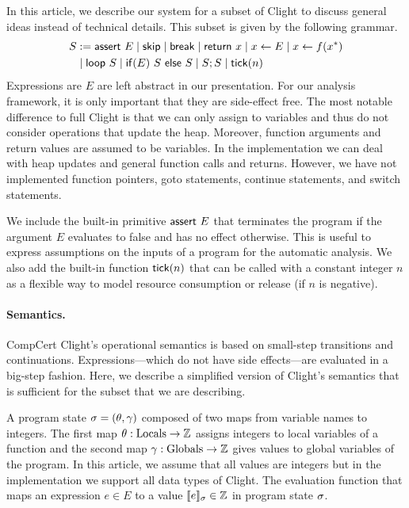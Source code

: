 \documentclass[nocopyrightspace,preprint]{sigplanconf}
\begin{document}
In this article, we describe our system for a subset of Clight to
discuss general ideas instead of technical details.  This subset is
given by the following grammar.
%
\begin{align*}
S &:= \mathsf{assert}~E
\mid \mathsf{skip}
\mid \mathsf{break}
\mid \mathsf{return}~x
\mid x \gets E
\mid x \gets f(x^*)
\\
& \mid \mathsf{loop}~S
\mid \mathsf{if}(E)~S~\mathsf{else}~S
\mid S;S
\mid \mathsf{tick}(n)
\end{align*}
%
Expressions are $E$ are left abstract in our presentation.  For our
analysis framework, it is only important that they are side-effect
free.
%
The most notable difference to full Clight is that we can only assign
to variables and thus do not consider operations that update the heap.
Moreover, function arguments and return values are assumed to be
variables.  In the implementation we can deal with heap updates and
general function calls and returns.  However, we have not implemented
function pointers, goto statements, continue statements, and switch
statements.

We include the built-in primitive $\mathsf{assert}~E$ that terminates
the program if the argument $E$ evaluates to false and has no effect
otherwise.  This is useful to express assumptions on the inputs of a
program for the automatic analysis.  We also add the built-in function
$\mathsf{tick}(n)$ that can be called with a constant integer $n$ as a
flexible way to model resource consumption or release (if $n$ is
negative).


\paragraph{Semantics.}

CompCert Clight's operational semantics is based on small-step
transitions and continuations.  Expressions---which do not have side
effects---are evaluated in a big-step fashion.  Here, we describe a
simplified version of Clight's semantics that is sufficient for the
subset that we are describing.

A program state $\sigma = (\theta, \gamma)$ composed of two maps from
variable names to integers. The first map $\theta : \text{Locals} \to
\mathbb{Z}$ assigns integers to local variables of a function and the second
map $\gamma : \text{Globals} \to \mathbb{Z}$ gives values to global variables
of the program.  In this article, we assume that all values are
integers but in the implementation we support all data types of
Clight.
%
The evaluation function \evalE{\cdot}{} that maps an expression $e \in
E$ to a value $\llbracket e \rrbracket_{\sigma} \in \mathbb{Z}$ in program state $\sigma$.
\end{document}
